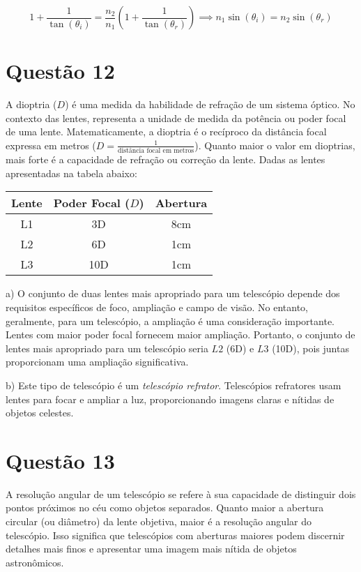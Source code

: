 \documentclass[a4paper, 12pt]{article}
\begin{document}
\[
1 + \frac{1}{\tan(\theta_i)} = \frac{n_2}{n_1} \left(1 + \frac{1}{\tan(\theta_r)}\right) \implies n_1 \sin(\theta_i) = n_2 \sin(\theta_r)
\]

\section*{Questão 12}

A dioptria (\(D\)) é uma medida da habilidade de refração de um sistema óptico. No contexto das lentes, representa a unidade de medida da potência ou poder focal de uma lente. Matematicamente, a dioptria é o recíproco da distância focal expressa em metros (\(D = \frac{1}{\text{distância focal em metros}}\)). Quanto maior o valor em dioptrias, mais forte é a capacidade de refração ou correção da lente. Dadas as lentes apresentadas na tabela abaixo:

\begin{center}
\begin{tabular}{|c|c|c|}
\hline
Lente & Poder Focal (\(D\)) & Abertura \\
\hline
L1 & 3D & 8cm \\
L2 & 6D & 1cm \\
L3 & 10D & 1cm \\
\hline
\end{tabular}
\end{center}

a) O conjunto de duas lentes mais apropriado para um telescópio depende dos requisitos específicos de foco, ampliação e campo de visão. No entanto, geralmente, para um telescópio, a ampliação é uma consideração importante. Lentes com maior poder focal fornecem maior ampliação. Portanto, o conjunto de lentes mais apropriado para um telescópio seria \(L2\) (6D) e \(L3\) (10D), pois juntas proporcionam uma ampliação significativa.

b) Este tipo de telescópio é um \textit{telescópio refrator}. Telescópios refratores usam lentes para focar e ampliar a luz, proporcionando imagens claras e nítidas de objetos celestes.
\section*{Questão 13}

A resolução angular de um telescópio se refere à sua capacidade de distinguir dois pontos próximos no céu como objetos separados. Quanto maior a abertura circular (ou diâmetro) da lente objetiva, maior é a resolução angular do telescópio. Isso significa que telescópios com aberturas maiores podem discernir detalhes mais finos e apresentar uma imagem mais nítida de objetos astronômicos.
\end{document}
